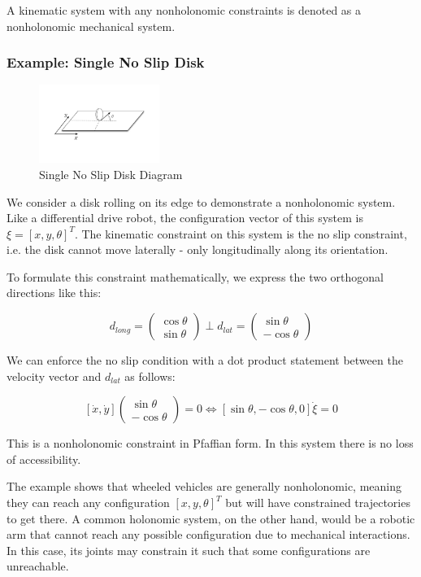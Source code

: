 \documentclass[twoside]{article}
\begin{document}
A kinematic system with any nonholonomic constraints is denoted as a nonholonomic mechanical system.

\subsubsection*{Example: Single No Slip Disk \cite{ssvo}}

\begin{figure}[H]
\centering
\includegraphics[width=0.35\textwidth]{Slip_Disk_Example}
\caption{Single No Slip Disk Diagram}
\end{figure}

We consider a disk rolling on its edge to demonstrate a nonholonomic system. Like a differential drive robot, the configuration vector of this system is $ \xi = [x, y, \theta]^T $. The kinematic constraint on this system is the no slip constraint, i.e. the disk cannot move laterally - only longitudinally along its orientation.

To formulate this constraint mathematically, we express the two orthogonal directions like this:

\[ d_{long} =
\begin{pmatrix} \cos \theta \\ \sin \theta \end{pmatrix}
\perp
d_{lat} =
\begin{pmatrix} \sin \theta \\ -\cos \theta \end{pmatrix}
\]

We can enforce the no slip condition with a dot product statement between the velocity vector and $ d_{lat} $ as follows:

$$
[\dot{x},  \dot{y}] \begin{pmatrix} \sin \theta \\ -\cos \theta \end{pmatrix} = 0 \iff
[\sin \theta, -\cos \theta, 0] \dot{\xi} = 0
$$

This is a nonholonomic constraint in Pfaffian form. In this system there is no loss of accessibility.

The example shows that wheeled vehicles are generally nonholonomic, meaning they can reach any configuration $[x,y,\theta]^T$ but will have constrained trajectories to get there. A common holonomic system, on the other hand, would be a robotic arm that cannot reach any possible configuration due to mechanical interactions. In this case, its joints may constrain it such that some configurations are unreachable.
\end{document}
